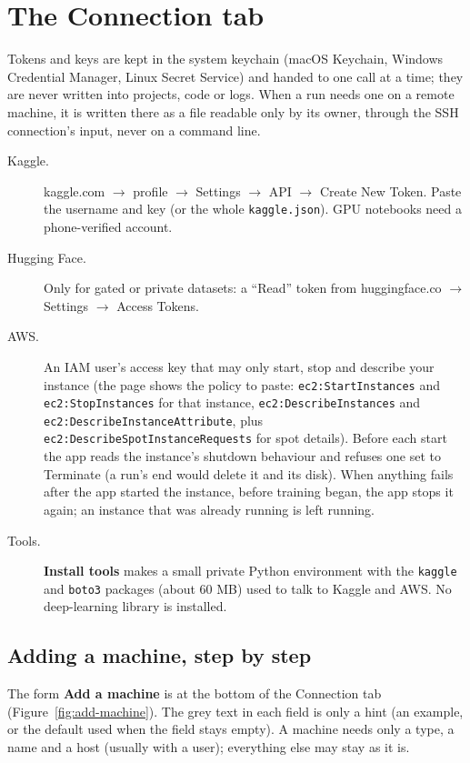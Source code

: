 \documentclass[11pt,a4paper]{article}
\newcommand{\ui}[1]{\textbf{\textsf{#1}}}
\newcommand{\file}[1]{\texttt{#1}}
\begin{document}
\section{The Connection tab}

Tokens and keys are kept in the system keychain (macOS Keychain, Windows Credential Manager, Linux Secret Service) and handed to one call
at a time; they are never written into projects, code or logs. When a run needs one on a remote machine, it is written there as a file
readable only by its owner, through the SSH connection's input, never on a command line.

\begin{description}
  \item[Kaggle.] kaggle.com $\rightarrow$ profile $\rightarrow$ Settings $\rightarrow$ API $\rightarrow$ Create New Token. Paste the
        username and key (or the whole \file{kaggle.json}). GPU notebooks need a phone-verified account.
  \item[Hugging Face.] Only for gated or private datasets: a ``Read'' token from huggingface.co $\rightarrow$ Settings $\rightarrow$
        Access Tokens.
  \item[AWS.] An IAM user's access key that may only start, stop and describe your instance (the page shows the policy to paste:
        \texttt{ec2:StartInstances} and \texttt{ec2:StopInstances} for that instance, \texttt{ec2:DescribeInstances} and
        \texttt{ec2:DescribeInstanceAttribute}, plus \texttt{ec2:DescribeSpotInstanceRequests} for spot details). Before each start the
        app reads the instance's shutdown behaviour and refuses one set to Terminate (a run's end would delete it and its disk). When
        anything fails after the app started the instance, before training began, the app stops it again; an instance that was already
        running is left running.
  \item[Tools.] \ui{Install tools} makes a small private Python environment with the \texttt{kaggle} and \texttt{boto3} packages (about
        60 MB) used to talk to Kaggle and AWS. No deep-learning library is installed.
\end{description}

\subsection{Adding a machine, step by step}
\label{sec:add-machine}
The form \ui{Add a machine} is at the bottom of the Connection tab (Figure~\ref{fig:add-machine}). The grey text in each field is only a hint
(an example, or the default used when the field stays empty). A machine needs only a type, a name and a host (usually with a user);
everything else may stay as it is.
\end{document}
